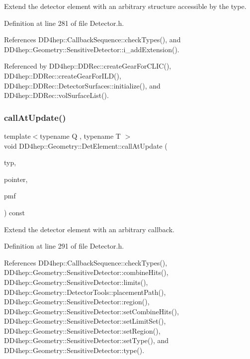 Extend the detector element with an arbitrary structure accessible by the type. 



Definition at line 281 of file Detector.\+h.



References D\+D4hep\+::\+Callback\+Sequence\+::check\+Types(), and D\+D4hep\+::\+Geometry\+::\+Sensitive\+Detector\+::i\+\_\+add\+Extension().



Referenced by D\+D4hep\+::\+D\+D\+Rec\+::create\+Gear\+For\+C\+L\+I\+C(), D\+D4hep\+::\+D\+D\+Rec\+::create\+Gear\+For\+I\+L\+D(), D\+D4hep\+::\+D\+D\+Rec\+::\+Detector\+Surfaces\+::initialize(), and D\+D4hep\+::\+D\+D\+Rec\+::vol\+Surface\+List().

\hypertarget{class_d_d4hep_1_1_geometry_1_1_det_element_ad54eb9f407346f0a5fdc84713df1e218}{}\label{class_d_d4hep_1_1_geometry_1_1_det_element_ad54eb9f407346f0a5fdc84713df1e218} 
\subsubsection{\texorpdfstring{call\+At\+Update()}{callAtUpdate()}}
{\footnotesize\ttfamily template$<$typename Q , typename T $>$ \\
void D\+D4hep\+::\+Geometry\+::\+Det\+Element\+::call\+At\+Update (\begin{DoxyParamCaption}\item[{unsigned int}]{typ,  }\item[{Q $\ast$}]{pointer,  }\item[{void(T\+::$\ast$)(unsigned long typ, \hyperlink{class_d_d4hep_1_1_geometry_1_1_det_element}{Det\+Element} \&det, void $\ast$opt\+\_\+par)}]{pmf }\end{DoxyParamCaption}) const\hspace{0.3cm}{\ttfamily [inline]}}



Extend the detector element with an arbitrary callback. 



Definition at line 291 of file Detector.\+h.



References D\+D4hep\+::\+Callback\+Sequence\+::check\+Types(), D\+D4hep\+::\+Geometry\+::\+Sensitive\+Detector\+::combine\+Hits(), D\+D4hep\+::\+Geometry\+::\+Sensitive\+Detector\+::limits(), D\+D4hep\+::\+Geometry\+::\+Detector\+Tools\+::placement\+Path(), D\+D4hep\+::\+Geometry\+::\+Sensitive\+Detector\+::region(), D\+D4hep\+::\+Geometry\+::\+Sensitive\+Detector\+::set\+Combine\+Hits(), D\+D4hep\+::\+Geometry\+::\+Sensitive\+Detector\+::set\+Limit\+Set(), D\+D4hep\+::\+Geometry\+::\+Sensitive\+Detector\+::set\+Region(), D\+D4hep\+::\+Geometry\+::\+Sensitive\+Detector\+::set\+Type(), and D\+D4hep\+::\+Geometry\+::\+Sensitive\+Detector\+::type().




